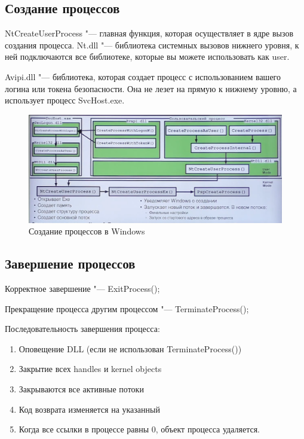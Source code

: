 \documentclass[bachelor, och, book]{SCWorks}
\theoremstyle{remark}
\begin{document}
    \subsection{Создание процессов}

    NtCreateUserProcess "--- главная функция, которая осуществляет в ядре вызов создания процесса. Nt.dll "--- библиотека системных вызовов нижнего уровня, к ней подключаются все библиотеке, которые вы можете использовать как user.

    Avipi.dll "--- библиотека, которая создает процесс с использованием вашего логина или токена безопасности. Она не лезет на прямую к нижнему уровню, а использует процесс SvcHost.exe.

    \begin{figure}[H]
        \begin{center}
            \includegraphics[scale=0.4]{res/Create-process-windows.png}
            \caption{Создание процессов в Windows}
        \end{center}
    \end{figure}

    \subsection{Завершение процессов}

    Корректное завершение "--- ExitProcess();

    Прекращение процесса другим процессом "--- TerminateProcess();

    \hfill \break
    Последовательность завершения процесса:

    \begin{enumerate}
        \item Оповещение DLL (если не использован TerminateProcess())
        \item Закрытие всех handles и kernel objects
        \item Закрываются все активные потоки
        \item Код возврата изменяется на указанный
        \item Когда все ссылки в процессе равны 0, объект процесса удаляется.
    \end{enumerate}
\end{document}
